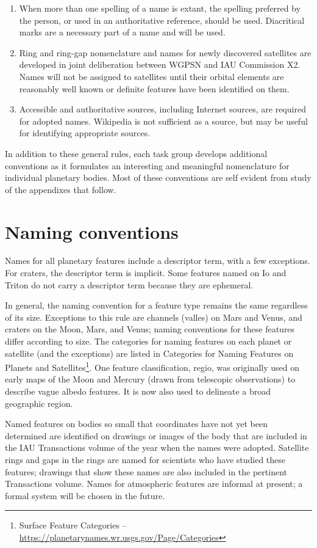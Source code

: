\begin{enumerate}
\item When more than one spelling of a name is extant, the spelling preferred by the person, or used in an authoritative reference, should be used. Diacritical marks are a necessary part of a name and will be used.
\item Ring and ring-gap nomenclature and names for newly discovered satellites are developed in joint deliberation between WGPSN and IAU Commission X2. Names will not be assigned to satellites until their orbital elements are reasonably well known or definite features have been identified on them.
\item Accessible and authoritative sources, including Internet sources, are required for adopted names. Wikipedia is not sufficient as a source, but may be useful for identifying appropriate sources.
\end{enumerate}

In addition to these general rules, each task group develops additional conventions as it formulates an interesting and meaningful nomenclature for individual planetary bodies. Most of these conventions are self evident from study of the appendixes that follow.

\section{Naming conventions}
\label{sec:Nomenclature:NamingConventions}
Names for all planetary features include a descriptor term, with a few exceptions. For craters, the descriptor term is implicit. Some features named on Io and Triton do not carry a descriptor term because they are ephemeral.

In general, the naming convention for a feature type remains the same regardless of its size. Exceptions to this rule are channels (valles) on Mars and Venus, and craters on the Moon, Mars, and Venus; naming conventions for these features differ according to size. The categories for naming features on each planet or satellite (and the exceptions) are listed in Categories for Naming Features on Planets and Satellites\footnote{Surface Feature Categories -- \url{https://planetarynames.wr.usgs.gov/Page/Categories}}. One feature classification, regio, was originally used on early maps of the Moon and Mercury (drawn from telescopic observations) to describe vague albedo features. It is now also used to delineate a broad geographic region.

Named features on bodies so small that coordinates have not yet been determined are identified on drawings or images of the body that are included in the IAU Transactions volume of the year when the names were adopted. Satellite rings and gaps in the rings are named for scientists who have studied these features; drawings that show these names are also included in the pertinent Transactions volume. Names for atmospheric features are informal at present; a formal system will be chosen in the future.

